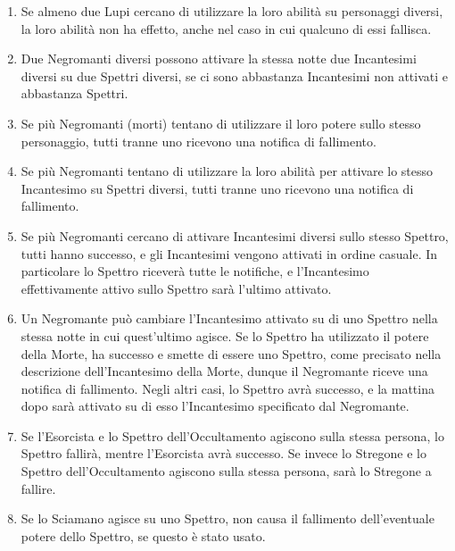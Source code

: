 \documentclass[a4paper,10pt]{article}
\begin{document}
\begin{enumerate}
	\item Se almeno due Lupi cercano di utilizzare la loro abilità su personaggi diversi, la loro abilità non ha effetto, anche nel caso in cui qualcuno di essi fallisca.
	
	\item Due Negromanti diversi possono attivare la stessa notte due Incantesimi diversi su due Spettri diversi, se ci sono abbastanza Incantesimi non attivati e abbastanza Spettri.
	
	\item Se più Negromanti (morti) tentano di utilizzare il loro potere sullo stesso personaggio, tutti tranne uno ricevono una notifica di fallimento.
	
	\item Se più Negromanti tentano di utilizzare la loro abilità per attivare lo stesso Incantesimo su Spettri diversi, tutti tranne uno ricevono una notifica di fallimento.
	
	\item Se più Negromanti cercano di attivare Incantesimi diversi sullo stesso Spettro, tutti hanno successo, e gli Incantesimi vengono attivati in ordine casuale. In particolare lo Spettro riceverà tutte le notifiche, e l'Incantesimo effettivamente attivo sullo Spettro sarà l'ultimo attivato.
	
	\item Un Negromante può cambiare l'Incantesimo attivato su di uno Spettro nella stessa notte in cui quest'ultimo agisce. Se lo Spettro ha utilizzato il potere della Morte, ha successo e smette di essere uno Spettro, come precisato nella descrizione dell'Incantesimo della Morte, dunque il Negromante riceve una notifica di fallimento. Negli altri casi, lo Spettro avrà successo, e la mattina dopo sarà attivato su di esso l'Incantesimo specificato dal Negromante.
	
	\item Se l'Esorcista e lo Spettro dell'Occultamento agiscono sulla stessa persona, lo Spettro fallirà, mentre l'Esorcista avrà successo. Se invece lo Stregone e lo Spettro dell'Occultamento agiscono sulla stessa persona, sarà lo Stregone a fallire.
	
	\item Se lo Sciamano agisce su uno Spettro, non causa il fallimento dell'eventuale potere dello Spettro, se questo è stato usato.
	

\end{enumerate}
\end{document}
